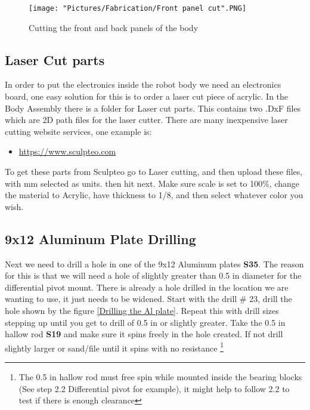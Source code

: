 \documentclass[12pt]{article}
\begin{document}
\begin{figure}[H]
	\centering
	\texttt{[image: "Pictures/Fabrication/Front panel cut".PNG]}
  	\caption{Cutting the front and back panels of the body}
  	\label{fb panel cut}
\end{figure}


\subsection{Laser Cut parts}

In order to put the electronics inside the robot body we need an electronics board, one easy solution for this is to order a laser cut piece of acrylic. In the Body Assembly there is a folder for Laser cut parts. This contains two .DxF files which are 2D path files for the laser cutter. There are many inexpensive laser cutting website services, one example is:

\begin{itemize}
	\item \href{https://www.sculpteo.com}{https://www.sculpteo.com}
\end{itemize}

To get these parts from Sculpteo go to Laser cutting, and then upload these files, with mm selected as units. then hit next. Make sure scale is set to 100\%, change the material to Acrylic, have thickness to 1/8, and then select whatever color you wish. 


\subsection{9x12 Aluminum Plate Drilling}
Next we need to drill a hole in one of the 9x12 Aluminum plates \textbf{S35}. The reason for this is that we will need a hole of slightly greater than 0.5 in diameter for the differential pivot mount. There is already a hole drilled in the location we are wanting to use, it just needs to be widened. Start with the drill \# 23, drill the hole shown by the figure \ref{Drilling the Al plate}. Repeat this with drill sizes stepping up until you get to drill of 0.5 in or slightly greater. Take the 0.5 in hallow rod \textbf{S19} and make sure it spins freely in the hole created. If not drill slightly larger or sand/file until it spins with no resistance \footnote{The 0.5 in hallow rod must free spin while mounted inside the bearing blocks (See step 2.2 Differential pivot for example), it might help to follow 2.2 to test if there is enough clearance} 
\end{document}
